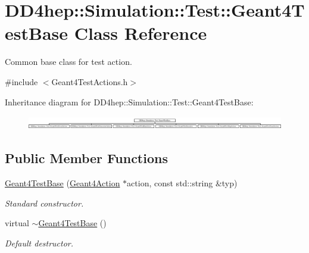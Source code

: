 \hypertarget{class_d_d4hep_1_1_simulation_1_1_test_1_1_geant4_test_base}{}\section{D\+D4hep\+:\+:Simulation\+:\+:Test\+:\+:Geant4\+Test\+Base Class Reference}
\label{class_d_d4hep_1_1_simulation_1_1_test_1_1_geant4_test_base}


Common base class for test action.  




{\ttfamily \#include $<$Geant4\+Test\+Actions.\+h$>$}

Inheritance diagram for D\+D4hep\+:\+:Simulation\+:\+:Test\+:\+:Geant4\+Test\+Base\+:\begin{figure}[H]
\begin{center}
\leavevmode
\includegraphics[height=0.583333cm]{class_d_d4hep_1_1_simulation_1_1_test_1_1_geant4_test_base}
\end{center}
\end{figure}
\subsection*{Public Member Functions}
\begin{DoxyCompactItemize}
\item 
\hyperlink{class_d_d4hep_1_1_simulation_1_1_test_1_1_geant4_test_base_aa66e1731de4829c114fd6fd8452a795b}{Geant4\+Test\+Base} (\hyperlink{class_d_d4hep_1_1_simulation_1_1_geant4_action}{Geant4\+Action} $\ast$action, const std\+::string \&typ)
\begin{DoxyCompactList}\small\item\em Standard constructor. \end{DoxyCompactList}\item 
virtual \hyperlink{class_d_d4hep_1_1_simulation_1_1_test_1_1_geant4_test_base_aa2aa8fa1fb375f02c3fa54116c90ef27}{$\sim$\+Geant4\+Test\+Base} ()
\begin{DoxyCompactList}\small\item\em Default destructor. \end{DoxyCompactList}\end{DoxyCompactItemize}
